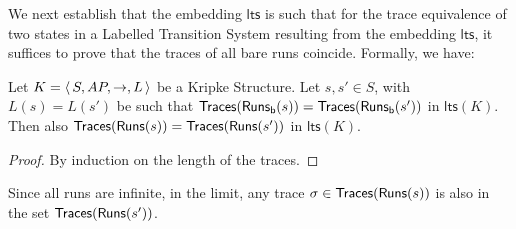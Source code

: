 \documentclass{llncs}
\newcommand{\kstrans}{\to}
\newcommand{\lts}{\mathsf{lts}}
\begin{document}
We next establish that the embedding $\lts$ is such that for the trace
equivalence of two states in a Labelled Transition System resulting from
the embedding $\lts$, it suffices to prove that the traces of all bare runs
coincide.  Formally, we have:

\begin{lemma}
\label{lem:bareruns2}
Let $K = \tuple{S, AP, \kstrans, L}$ be a Kripke Structure. Let $s,
s' \in S$, with $L(s) = L(s')$ be such that $\mathsf{Traces}(\mathsf{Runs_b}(s)) =
\mathsf{Traces}(\mathsf{Runs_b}(s'))$ in $\lts(K)$. Then also $\mathsf{Traces}(\mathsf{Runs}(s)) =
\mathsf{Traces}(\mathsf{Runs}(s'))$ in $\lts(K)$.

\end{lemma}

\begin{proof} By induction on the length of the traces.
\end{proof}
Since all runs are infinite, in the limit, any trace $\sigma \in
\mathsf{Traces}(\mathsf{Runs}(s))$ is also in the set $\mathsf{Traces}(\mathsf{Runs}(s'))$.
\end{document}
